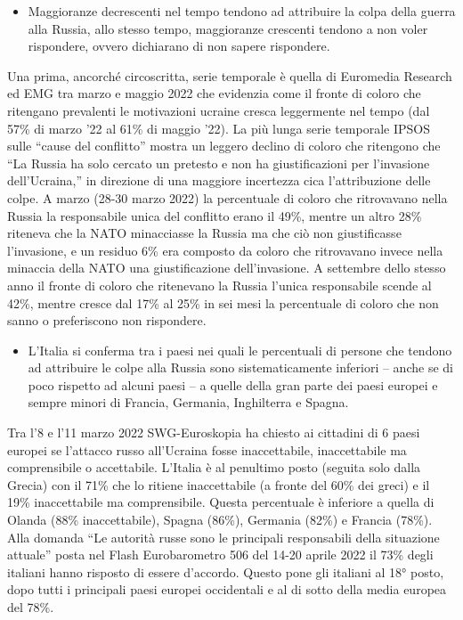 \documentclass[
]{book}
\providecommand{\tightlist}{%
  \setlength{\itemsep}{0pt}\setlength{\parskip}{0pt}}
\begin{document}
\begin{itemize}
\tightlist
\item
  Maggioranze decrescenti nel tempo tendono ad attribuire la colpa della guerra alla Russia, allo stesso tempo, maggioranze crescenti tendono a non voler rispondere, ovvero dichiarano di non sapere rispondere.
\end{itemize}

Una prima, ancorché circoscritta, serie temporale è quella di Euromedia Research ed EMG tra marzo e maggio 2022 che evidenzia come il fronte di coloro che ritengano prevalenti le motivazioni ucraine cresca leggermente nel tempo (dal 57\% di marzo '22 al 61\% di maggio '22). La più lunga serie temporale IPSOS sulle ``cause del conflitto'' mostra un leggero declino di coloro che ritengono che ``La Russia ha solo cercato un pretesto e non ha giustificazioni per l'invasione dell'Ucraina,'' in direzione di una maggiore incertezza cica l'attribuzione delle colpe. A marzo (28-30 marzo 2022) la percentuale di coloro che ritrovavano nella Russia la responsabile unica del conflitto erano il 49\%, mentre un altro 28\% riteneva che la NATO minacciasse la Russia ma che ciò non giustificasse l'invasione, e un residuo 6\% era composto da coloro che ritrovavano invece nella minaccia della NATO una giustificazione dell'invasione. A settembre dello stesso anno il fronte di coloro che ritenevano la Russia l'unica responsabile scende al 42\%, mentre cresce dal 17\% al 25\% in sei mesi la percentuale di coloro che non sanno o preferiscono non rispondere.

\begin{itemize}
\tightlist
\item
  L'Italia si conferma tra i paesi nei quali le percentuali di persone che tendono ad attribuire le colpe alla Russia sono sistematicamente inferiori -- anche se di poco rispetto ad alcuni paesi -- a quelle della gran parte dei paesi europei e sempre minori di Francia, Germania, Inghilterra e Spagna.
\end{itemize}

Tra l'8 e l'11 marzo 2022 SWG-Euroskopia ha chiesto ai cittadini di 6 paesi europei se l'attacco russo all'Ucraina fosse inaccettabile, inaccettabile ma comprensibile o accettabile. L'Italia è al penultimo posto (seguita solo dalla Grecia) con il 71\% che lo ritiene inaccettabile (a fronte del 60\% dei greci) e il 19\% inaccettabile ma comprensibile. Questa percentuale è inferiore a quella di Olanda (88\% inaccettabile), Spagna (86\%), Germania (82\%) e Francia (78\%). Alla domanda ``Le autorità russe sono le principali responsabili della situazione attuale'' posta nel Flash Eurobarometro 506 del 14-20 aprile 2022 il 73\% degli italiani hanno risposto di essere d'accordo. Questo pone gli italiani al 18° posto, dopo tutti i principali paesi europei occidentali e al di sotto della media europea del 78\%.
\end{document}
